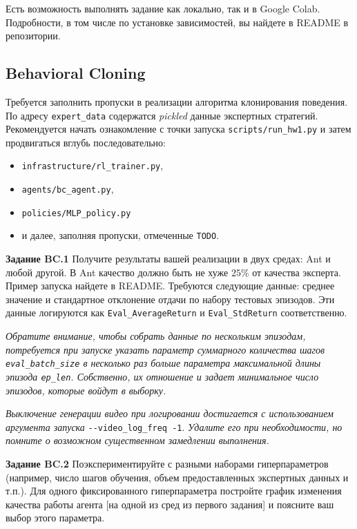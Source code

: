 \documentclass[12pt, oneside]{article}
\begin{document}
Есть возможность выполнять задание как локально, так и в Google Colab. Подробности, в том числе по установке зависимостей, вы найдете в README в репозитории.

\subsection{Behavioral Cloning}

Требуется заполнить пропуски в реализации алгоритма клонирования поведения. По адресу \verb|expert_data| содержатся \textit{pickled} данные экспертных стратегий. Рекомендуется начать ознакомление с точки запуска \verb|scripts/run_hw1.py| и затем продвигаться вглубь последовательно:

\begin{itemize}
    \item \verb|infrastructure/rl_trainer.py|,
    \item \verb|agents/bc_agent.py|,
    \item \verb|policies/MLP_policy.py|
    \item и далее, заполняя пропуски, отмеченные \verb|TODO|.
\end{itemize}

\textbf{Задание BC.1} Получите результаты вашей реализации в двух средах: Ant и любой другой. В Ant качество должно быть не хуже $25\%$ от качества эксперта. Пример запуска найдете в README. Требуются следующие данные: среднее значение и стандартное отклонение отдачи по набору тестовых эпизодов. Эти данные логируются как \verb|Eval_AverageReturn| и \verb|Eval_StdReturn| соответственно.

\textit{Обратите внимание, чтобы собрать данные по нескольким эпизодам, потребуется при запуске указать параметр суммарного количества шагов \texttt{eval\_batch\_size} в несколько раз больше параметра максимальной длины эпизода \texttt{ep\_len}. Собственно, их отношение и задает минимальное число эпизодов, которые войдут в выборку.}

\textit{Выключение генерации видео при логировании достигается с использованием аргумента запуска} \verb|--video_log_freq -1|. \textit{Удалите его при необходимости, но помните о возможном существенном замедлении выполнения.}

\textbf{Задание BC.2} Поэкспериментируйте с разными наборами гиперпараметров (например, число шагов обучения, объем предоставленных экспертных данных и т.п.). Для одного фиксированного гиперпараметра постройте график изменения качества работы агента [на одной из сред из первого задания] и поясните ваш выбор этого параметра.
\end{document}

